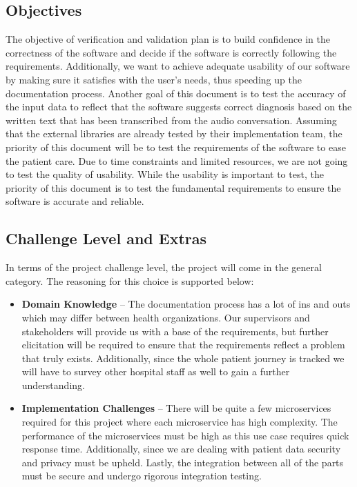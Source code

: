 \documentclass[12pt, titlepage]{article}
\begin{document}
\subsection{Objectives} \label{section:2.2}

The objective of verification and validation plan is to build confidence in the correctness of the software and decide if the software is correctly following the requirements. Additionally, we want to achieve adequate usability of our software by making sure it satisfies with the user's needs, thus speeding up the documentation process. Another goal of this document is to test the accuracy of the input data to reflect that the software suggests correct diagnosis based on the written text that has been transcribed from the audio conversation. Assuming that the external libraries are already tested by their implementation team, the priority of this document will be to test the requirements of the software to ease the patient care. Due to time constraints and limited resources, we are not going to test the quality of usability. While the usability is important to test, the priority of this document is to test the fundamental requirements to ensure the software is accurate and reliable. 

\subsection{Challenge Level and Extras} \label{section:2.3}

In terms of the project challenge level, the project will come in the general category. The reasoning for this choice is supported below:

\begin{itemize}
  \item\textbf{Domain Knowledge} -- The documentation process has a lot of ins and outs which may differ between health organizations. Our supervisors and stakeholders will provide us with a base of the requirements, but further elicitation will be required to ensure that the requirements reflect a problem that truly exists. Additionally, since the whole patient journey is tracked we will have to survey other hospital staff as well to gain a further understanding. 
  \item\textbf{Implementation Challenges} -- There will be quite a few microservices required for this project where each microservice has high complexity. The performance of the microservices must be high as this use case requires quick response time. Additionally, since we are dealing with patient data security and privacy must be upheld. Lastly, the integration between all of the parts must be secure and undergo rigorous integration testing.
\end{itemize}
\end{document}
